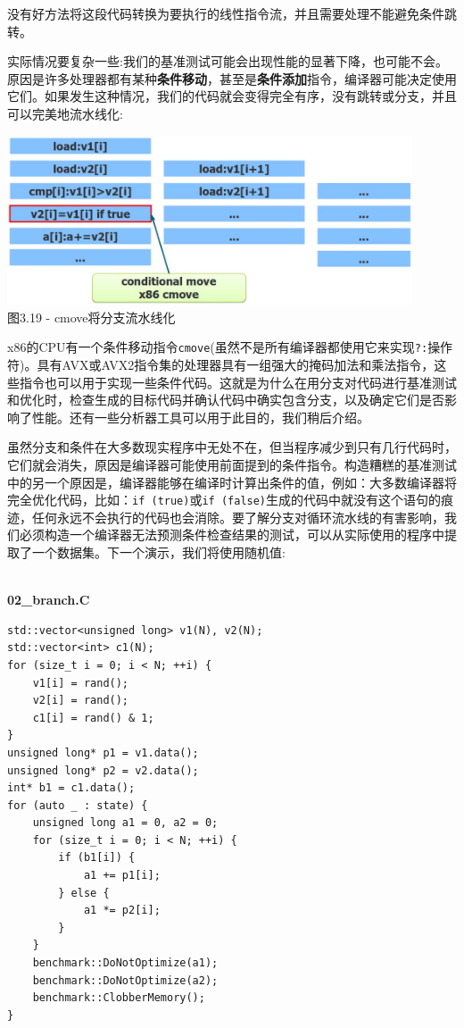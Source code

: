 没有好方法将这段代码转换为要执行的线性指令流，并且需要处理不能避免条件跳转。

实际情况要复杂一些:我们的基准测试可能会出现性能的显著下降，也可能不会。原因是许多处理器都有某种\textbf{条件移动}，甚至是\textbf{条件添加}指令，编译器可能决定使用它们。如果发生这种情况，我们的代码就会变得完全有序，没有跳转或分支，并且可以完美地流水线化:

\begin{center}
\includegraphics[width=0.9\textwidth]{content/1/chapter3/images/19.jpg}\\
图3.19 - cmove将分支流水线化
\end{center}

x86的CPU有一个条件移动指令\texttt{cmove}(虽然不是所有编译器都使用它来实现\texttt{?:}操作符)。具有AVX或AVX2指令集的处理器具有一组强大的掩码加法和乘法指令，这些指令也可以用于实现一些条件代码。这就是为什么在用分支对代码进行基准测试和优化时，检查生成的目标代码并确认代码中确实包含分支，以及确定它们是否影响了性能。还有一些分析器工具可以用于此目的，我们稍后介绍。

虽然分支和条件在大多数现实程序中无处不在，但当程序减少到只有几行代码时，它们就会消失，原因是编译器可能使用前面提到的条件指令。构造糟糕的基准测试中的另一个原因是，编译器能够在编译时计算出条件的值，例如：大多数编译器将完全优化代码，比如：\texttt{if (true)}或\texttt{if (false)}生成的代码中就没有这个语句的痕迹，任何永远不会执行的代码也会消除。要了解分支对循环流水线的有害影响，我们必须构造一个编译器无法预测条件检查结果的测试，可以从实际使用的程序中提取了一个数据集。下一个演示，我们将使用随机值:

\hspace*{\fill} \\ %
\noindent
\textbf{02\_branch.C}
\begin{lstlisting}[style=styleCXX]
std::vector<unsigned long> v1(N), v2(N);
std::vector<int> c1(N);
for (size_t i = 0; i < N; ++i) {
	v1[i] = rand();
	v2[i] = rand();
	c1[i] = rand() & 1;
}
unsigned long* p1 = v1.data();
unsigned long* p2 = v2.data();
int* b1 = c1.data();
for (auto _ : state) {
	unsigned long a1 = 0, a2 = 0;
	for (size_t i = 0; i < N; ++i) {
		if (b1[i]) {
			a1 += p1[i];
		} else {
			a1 *= p2[i];
		}
	}
	benchmark::DoNotOptimize(a1);
	benchmark::DoNotOptimize(a2);
	benchmark::ClobberMemory();
}
\end{lstlisting}

